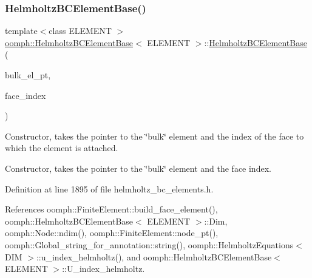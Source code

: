 \subsubsection{\texorpdfstring{Helmholtz\+B\+C\+Element\+Base()}{HelmholtzBCElementBase()}\hspace{0.1cm}{\footnotesize\ttfamily [1/3]}}
{\footnotesize\ttfamily template$<$class E\+L\+E\+M\+E\+NT $>$ \\
\hyperlink{classoomph_1_1HelmholtzBCElementBase}{oomph\+::\+Helmholtz\+B\+C\+Element\+Base}$<$ E\+L\+E\+M\+E\+NT $>$\+::\hyperlink{classoomph_1_1HelmholtzBCElementBase}{Helmholtz\+B\+C\+Element\+Base} (\begin{DoxyParamCaption}\item[{\hyperlink{classoomph_1_1FiniteElement}{Finite\+Element} $\ast$const \&}]{bulk\+\_\+el\+\_\+pt,  }\item[{const int \&}]{face\+\_\+index }\end{DoxyParamCaption})}



Constructor, takes the pointer to the \char`\"{}bulk\char`\"{} element and the index of the face to which the element is attached. 

Constructor, takes the pointer to the \char`\"{}bulk\char`\"{} element and the face index. 

Definition at line 1895 of file helmholtz\+\_\+bc\+\_\+elements.\+h.



References oomph\+::\+Finite\+Element\+::build\+\_\+face\+\_\+element(), oomph\+::\+Helmholtz\+B\+C\+Element\+Base$<$ E\+L\+E\+M\+E\+N\+T $>$\+::\+Dim, oomph\+::\+Node\+::ndim(), oomph\+::\+Finite\+Element\+::node\+\_\+pt(), oomph\+::\+Global\+\_\+string\+\_\+for\+\_\+annotation\+::string(), oomph\+::\+Helmholtz\+Equations$<$ D\+I\+M $>$\+::u\+\_\+index\+\_\+helmholtz(), and oomph\+::\+Helmholtz\+B\+C\+Element\+Base$<$ E\+L\+E\+M\+E\+N\+T $>$\+::\+U\+\_\+index\+\_\+helmholtz.

\mbox{\label{classoomph_1_1HelmholtzBCElementBase_a5d421cc79d20936a49dea012ef38077a}} 
